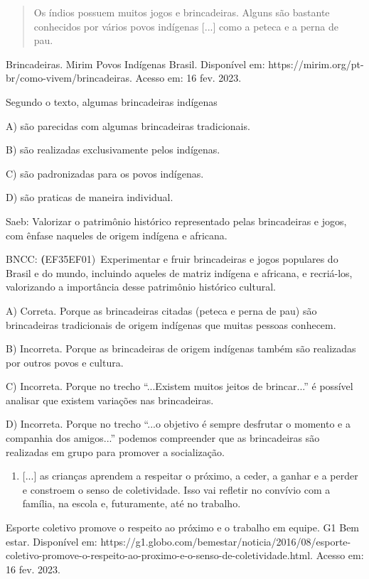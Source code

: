\begin{quote}
Os índios possuem muitos jogos e brincadeiras. Alguns são bastante
conhecidos por vários povos indígenas {[}...{]} como a peteca e a perna
de pau.~
\end{quote}

Brincadeiras. Mirim Povos Indígenas Brasil. Disponível em:
https://mirim.org/pt-br/como-vivem/brincadeiras. Acesso em: 16 fev.
2023.

Segundo o texto, algumas brincadeiras indígenas

A) são parecidas com algumas brincadeiras tradicionais.

B) são realizadas exclusivamente pelos indígenas.

C) são padronizadas para os povos indígenas.

D) são praticas de maneira individual.

Saeb: Valorizar o patrimônio histórico representado pelas brincadeiras e
jogos, com ênfase naqueles de origem indígena e africana.

BNCC: \textbf{(}EF35EF01)~Experimentar e fruir brincadeiras e jogos
populares do Brasil e do mundo, incluindo aqueles de matriz indígena e
africana, e recriá-los, valorizando a importância desse patrimônio
histórico cultural.

A) Correta. Porque as brincadeiras citadas (peteca e perna de pau) são
brincadeiras tradicionais de origem indígenas que muitas pessoas
conhecem.

B) Incorreta. Porque as brincadeiras de origem indígenas também são
realizadas por outros povos e cultura.

C) Incorreta. Porque no trecho ``...Existem muitos jeitos de
brincar...'' é possível analisar que existem variações nas brincadeiras.

D) Incorreta. Porque no trecho ``...o objetivo é sempre desfrutar o
momento e a companhia dos amigos...'' podemos compreender que as
brincadeiras são realizadas em grupo para promover a socialização.

\begin{enumerate}
\def\labelenumi{\arabic{enumi}.}
\item
  {[}...{]} as crianças aprendem a respeitar o próximo, a ceder, a
  ganhar e a perder e constroem o senso de coletividade. Isso vai
  refletir no convívio com a família, na escola e, futuramente, até no
  trabalho.
\end{enumerate}

Esporte coletivo promove o respeito ao próximo e o trabalho em equipe.
G1 Bem estar. Disponível em:
https://g1.globo.com/bemestar/noticia/2016/08/esporte-coletivo-promove-o-respeito-ao-proximo-e-o-senso-de-coletividade.html.
Acesso em: 16 fev. 2023.

